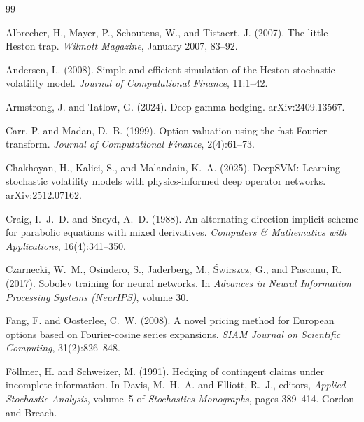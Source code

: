 \documentclass{article}
\begin{document}
\begin{thebibliography}{99}

Albrecher, H., Mayer, P., Schoutens, W., and Tistaert, J. (2007).
\newblock The little Heston trap.
\newblock \emph{Wilmott Magazine}, January 2007, 83--92.

Andersen, L. (2008).
\newblock Simple and efficient simulation of the Heston stochastic volatility model.
\newblock \emph{Journal of Computational Finance}, 11:1--42.

Armstrong, J. and Tatlow, G. (2024).
\newblock Deep gamma hedging.
\newblock arXiv:2409.13567.

Carr, P. and Madan, D.~B. (1999).
\newblock Option valuation using the fast Fourier transform.
\newblock \emph{Journal of Computational Finance}, 2(4):61--73.

Chakhoyan, H., Kalici, S., and Malandain, K.~A. (2025).
\newblock DeepSVM: Learning stochastic volatility models with physics-informed
deep operator networks.
\newblock arXiv:2512.07162.

Craig, I.~J.~D. and Sneyd, A.~D. (1988).
\newblock An alternating-direction implicit scheme for parabolic equations with
mixed derivatives.
\newblock \emph{Computers \& Mathematics with Applications}, 16(4):341--350.

Czarnecki, W.~M., Osindero, S., Jaderberg, M., \'Swirszcz, G., and Pascanu, R. (2017).
\newblock Sobolev training for neural networks.
\newblock In \emph{Advances in Neural Information Processing Systems (NeurIPS)}, volume 30.

Fang, F. and Oosterlee, C.~W. (2008).
\newblock A novel pricing method for European options based on Fourier-cosine
series expansions.
\newblock \emph{SIAM Journal on Scientific Computing}, 31(2):826--848.

F\"ollmer, H. and Schweizer, M. (1991).
\newblock Hedging of contingent claims under incomplete information.
\newblock In Davis, M.~H.~A. and Elliott, R.~J., editors, \emph{Applied Stochastic
Analysis}, volume~5 of \emph{Stochastics Monographs}, pages 389--414. Gordon and
Breach.


\end{thebibliography}
\end{document}
